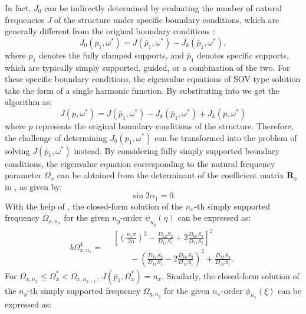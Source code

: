 \documentclass[preprint,12pt]{elsarticle}
\begin{document}
In fact, $ J_0 $ can be indirectly determined by evaluating the number of natural frequencies $ J $ of the structure under specific boundary conditions, which are generally different from the original boundary conditions \cite{han2018improved}:
%
\begin{equation}\label{eq:J_o_pin}
	J_0(p_1,\omega^*) = J(\bar{p}_1,\omega^*) - J_k(\bar{p}_1,\omega^*),
\end{equation}
%
where $ p_1 $ denotes the fully clamped supports, and $ \bar{p}_1 $ denotes specific supports, which are typically simply supported, guided, or a combination of the two.
For these specific boundary conditions, the eigenvalue equations of SOV type solution take the form of a single harmonic function.
By substituting  into  we get the algorithm as:  
%
\begin{equation}\label{eq:new_WWalgorithm}
	J(p,\omega^*) = J(\bar{p}_1,\omega^*) - J_k(\bar{p}_1,\omega^*) + J_k(p,\omega^*)
\end{equation} 
%
where $p$ represents the original boundary conditions of the structure.
Therefore, the challenge of determining $J_0(p_1, \omega^*)$ can be transformed into the problem of solving $ J(\bar{p}_1, \omega^*)$ instead. 
By considering fully simply supported boundary conditions, the eigenvalue equation corresponding to the natural frequency parameter $ \Omega_x $ can be obtained from the determinant of the coefficient matrix $ \mathbf{R}_x $ in , as given by:
%
\begin{equation}\label{eq:SSx} 
	\sin 2\alpha_1 = 0.
\end{equation}
%
With the help of , the closed-form solution of the $n_x$-th simply supported frequency $\Omega_{x,n_x}$ for the given $n_y$-order $\psi_{n_y}(\eta)$ can be expressed as:
%
\begin{equation}\label{eq:J_simpx}
	b \Omega^4_{x,n_x} =
		\begin{aligned}
			&\left[\left(\frac{n_x\pi}{2\alpha}\right)^2 - \frac{D_{12}S_2}{D_{11}S_1} + 2 \frac{D_{66}S_3}{D_{11}S_1}\right]^2 \\
			&\qquad- \left(\frac{D_{12}S_2}{D_{11}S_1} - 2 \frac{D_{66}S_3}{D_{11}S_1}\right)^2
			+ \frac{D_{22}S_4}{D_{11}S_1}.
		\end{aligned}
\end{equation}
%
For $\Omega_{x,n_x} \leq \Omega_x^* < \Omega_{x,n_{x+1}}$, $J(\bar{p}_1, \Omega_x^*) = n_x$.
Similarly, the closed-form solution of the $n_y$-th simply supported frequency $\Omega_{y,n_y}$ for the given $n_x$-order $\phi_{n_x}(\xi)$ can be expressed as:
\end{document}
